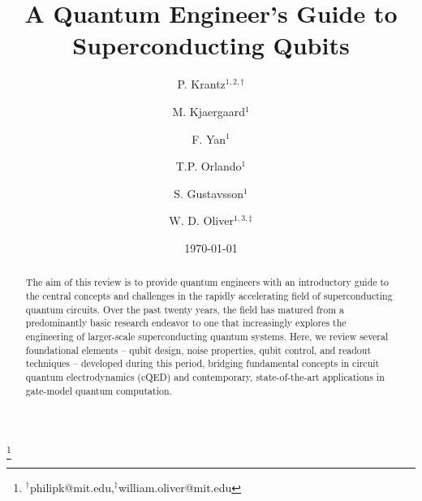 \documentclass[aip,apr,twocolumn,showpacs,superscriptaddress,groupedaddress,nofootinbib,reprint]{revtex4-1}  %
\begin{document}


\title{A Quantum Engineer's Guide to Superconducting Qubits}

\author{P. Krantz$^{1,2,\dagger}$}
\author{M. Kjaergaard$^{1}$}
\author{F. Yan$^{1}$}
\author{T.P. Orlando$^{1}$}
\author{S. Gustavsson$^{1}$}
\author{W. D. Oliver$^{1,3,\ddagger}$}


\footnote{$^\dagger$philipk@mit.edu,$^\ddagger$william.oliver@mit.edu}

\date{\today}

\begin{abstract}

The aim of this review is to provide quantum engineers with an introductory guide to the central concepts and challenges in the rapidly accelerating field of superconducting quantum circuits. Over the past twenty years, the field has matured from a predominantly basic research endeavor to one that increasingly explores the engineering of larger-scale superconducting quantum systems. Here, we review several foundational elements --  qubit design, noise properties, qubit control, and readout techniques -- developed during this period, bridging fundamental concepts in circuit quantum electrodynamics (cQED) and contemporary, state-of-the-art applications in gate-model quantum computation.

\end{abstract}

\pacs{}
\maketitle
\end{document}
